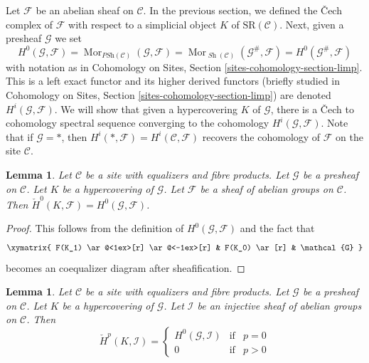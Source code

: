 \documentclass{stacks-project}
\theoremstyle{plain}
\newtheorem{lemma}[subsection]{Lemma}
\theoremstyle{definition}
\theoremstyle{remark}
\numberwithin{equation}{subsection}
\def\Mor{\mathop{\mathrm{Mor}}\nolimits}
\def\Sh{\mathop{\mathit{Sh}}\nolimits}
\begin{document}
\medskip\noindent
Let $\mathcal{F}$ be an abelian sheaf on $\mathcal{C}$.
In the previous section, we defined the {\v C}ech complex of $\mathcal{F}$
with respect to a simplicial object $K$ of $\text{SR}(\mathcal{C})$.
Next, given a presheaf $\mathcal{G}$ we set
$$
H^0(\mathcal{G}, \mathcal{F}) =
\Mor_{\textit{PSh}(\mathcal{C})}(\mathcal{G}, \mathcal{F}) =
\Mor_{\Sh(\mathcal{C})}(\mathcal{G}^\#, \mathcal{F}) =
H^0(\mathcal{G}^\#, \mathcal{F})
$$
with notation as in
Cohomology on Sites, Section \ref{sites-cohomology-section-limp}.
This is a left exact functor and its higher derived functors
(briefly studied in
Cohomology on Sites, Section \ref{sites-cohomology-section-limp})
are denoted $H^i(\mathcal{G}, \mathcal{F})$.
We will show that given a hypercovering $K$ of $\mathcal{G}$,
there is a {\v C}ech to cohomology spectral sequence converging to the
cohomology $H^i(\mathcal{G}, \mathcal{F})$.
Note that if $\mathcal{G} = *$, then
$H^i(*, \mathcal{F}) = H^i(\mathcal{C}, \mathcal{F})$ recovers
the cohomology of $\mathcal{F}$ on the site $\mathcal{C}$.

\begin{lemma}
\label{lemma-h0-cech-variant}
Let $\mathcal{C}$ be a site with equalizers and fibre products.
Let $\mathcal{G}$ be a presheaf on $\mathcal{C}$.
Let $K$ be a hypercovering of $\mathcal{G}$.
Let $\mathcal{F}$ be a sheaf of abelian groups on $\mathcal{C}$.
Then $\check{H}^0(K, \mathcal{F}) = H^0(\mathcal{G}, \mathcal{F})$.
\end{lemma}

\begin{proof}
This follows from the definition of $H^0(\mathcal{G}, \mathcal{F})$
and the fact that
$$
\xymatrix{
F(K_1) \ar@<1ex>[r] \ar@<-1ex>[r] &
F(K_0) \ar[r] & \mathcal{G}
}
$$
becomes an coequalizer diagram after sheafification.
\end{proof}

\begin{lemma}
\label{lemma-injective-trivial-cech-variant}
Let $\mathcal{C}$ be a site with equalizers and fibre products.
Let $\mathcal{G}$ be a presheaf on $\mathcal{C}$.
Let $K$ be a hypercovering of $\mathcal{G}$.
Let $\mathcal{I}$ be an injective sheaf of abelian groups on $\mathcal{C}$.
Then
$$
\check{H}^p(K, \mathcal{I}) =
\left\{
\begin{matrix}
H^0(\mathcal{G}, \mathcal{I}) & \text{if} & p = 0 \\
0 & \text{if} & p > 0
\end{matrix}
\right.
$$
\end{lemma}
\end{document}
